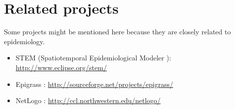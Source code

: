 \documentclass[10pt,a4paper]{article}
\begin{document}
\section{Related projects}
Some projects might be mentioned here because they are closely related to epidemiology.
\begin{itemize}
\item STEM (Spatiotemporal Epidemiological Modeler ): \url{http://www.eclipse.org/stem/}
\item Epigrass : \url{http://sourceforge.net/projects/epigrass/}
\item NetLogo : \url{http://ccl.northwestern.edu/netlogo/}
\end{itemize}


\newpage


\end{document}
